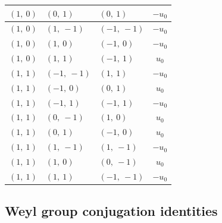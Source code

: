 \documentclass[11pt]{article}
\theoremstyle{definition}
\begin{document}
\begin{longtable}{|l|l|l|c|}
    \hline
    $\left( 1, \  0\right)$ & $\left( 0, \  1\right)$ & $\left( 0, \  1\right)$ & $- u_{0}$ \\
    \hline
    $\left( 1, \  0\right)$ & $\left( 1, \  -1\right)$ & $\left( -1, \  -1\right)$ & $- u_{0}$ \\
    \hline
    $\left( 1, \  0\right)$ & $\left( 1, \  0\right)$ & $\left( -1, \  0\right)$ & $- u_{0}$ \\
    \hline
    $\left( 1, \  0\right)$ & $\left( 1, \  1\right)$ & $\left( -1, \  1\right)$ & $u_{0}$ \\
    \hline
    $\left( 1, \  1\right)$ & $\left( -1, \  -1\right)$ & $\left( 1, \  1\right)$ & $- u_{0}$ \\
    \hline
    $\left( 1, \  1\right)$ & $\left( -1, \  0\right)$ & $\left( 0, \  1\right)$ & $u_{0}$ \\
    \hline
    $\left( 1, \  1\right)$ & $\left( -1, \  1\right)$ & $\left( -1, \  1\right)$ & $- u_{0}$ \\
    \hline
    $\left( 1, \  1\right)$ & $\left( 0, \  -1\right)$ & $\left( 1, \  0\right)$ & $u_{0}$ \\
    \hline
    $\left( 1, \  1\right)$ & $\left( 0, \  1\right)$ & $\left( -1, \  0\right)$ & $u_{0}$ \\
    \hline
    $\left( 1, \  1\right)$ & $\left( 1, \  -1\right)$ & $\left( 1, \  -1\right)$ & $- u_{0}$ \\
    \hline
    $\left( 1, \  1\right)$ & $\left( 1, \  0\right)$ & $\left( 0, \  -1\right)$ & $u_{0}$ \\
    \hline
    $\left( 1, \  1\right)$ & $\left( 1, \  1\right)$ & $\left( -1, \  -1\right)$ & $- u_{0}$ \\
    \hline
\end{longtable}


\subsection{Weyl group conjugation identities}
\end{document}
